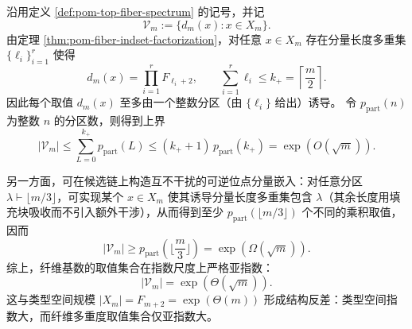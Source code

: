 \begin{remark}\label{rem:pom-fiber-value-set-complexity}
沿用定义 \ref{def:pom-top-fiber-spectrum} 的记号，并记
\[
\mathcal{V}_m:=\{d_m(x):x\in X_m\}.
\]
由定理 \ref{thm:pom-fiber-indset-factorization}，对任意 \(x\in X_m\) 存在分量长度多重集 \(\{\ell_i\}_{i=1}^r\) 使得
\[
d_m(x)=\prod_{i=1}^r F_{\ell_i+2},
\qquad
\sum_{i=1}^r \ell_i\le k_{+}=\left\lceil\frac{m}{2}\right\rceil.
\]
因此每个取值 \(d_m(x)\) 至多由一个整数分区（由 \(\{\ell_i\}\) 给出）诱导。
令 \(p_{\mathrm{part}}(n)\) 为整数 \(n\) 的分区数，则得到上界
\[
|\mathcal{V}_m|
\le
\sum_{L=0}^{k_{+}} p_{\mathrm{part}}(L)
\le
(k_{+}+1)\,p_{\mathrm{part}}(k_{+})
=\exp(O(\sqrt m)).
\]
\par
另一方面，可在候选链上构造互不干扰的可逆位点分量嵌入：对任意分区
\(\lambda\vdash \bigl\lfloor m/3\bigr\rfloor\)，可实现某个 \(x\in X_m\) 使其诱导分量长度多重集包含 \(\lambda\)（其余长度用填充块吸收而不引入额外干涉），从而得到至少 \(p_{\mathrm{part}}(\lfloor m/3\rfloor)\) 个不同的乘积取值，因而
\[
|\mathcal{V}_m|
\ge
p_{\mathrm{part}}\!\left(\Big\lfloor\frac{m}{3}\Big\rfloor\right)
=\exp(\Omega(\sqrt m)).
\]
综上，纤维基数的取值集合在指数尺度上严格亚指数：
\[
|\mathcal{V}_m|=\exp(\Theta(\sqrt m)).
\]
这与类型空间规模 \(|X_m|=F_{m+2}=\exp(\Theta(m))\) 形成结构反差：类型空间指数大，而纤维多重度取值集合仅亚指数大。
\end{remark}

